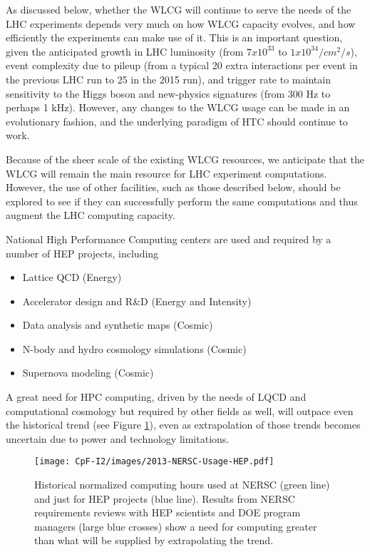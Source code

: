As discussed below, whether the WLCG will continue to serve the needs of the LHC experiments depends very much on how WLCG capacity evolves, and how efficiently the experiments can make use of it.  This is an important question, given the anticipated growth in LHC luminosity (from $7 x 10^33$ to $1 x 10^34 /cm^2/s$), event complexity due to pileup (from a typical 20 extra interactions per event in the previous LHC run to 25 in the 2015 run), and trigger rate to maintain sensitivity to the Higgs boson and new-physics signatures (from 300 Hz to perhaps 1 kHz).  However, any changes to the WLCG usage can be made in an evolutionary fashion, and the underlying paradigm of HTC should continue to work.

Because of the sheer scale of the existing WLCG resources, we anticipate that the WLCG will remain the main resource for LHC experiment computations.  However, the use of other facilities, such as those described below, should be explored to see if they can successfully perform the same computations and thus augment the LHC computing capacity.

National High Performance Computing centers are used and required by a number of HEP projects, including
\begin{itemize}
\item Lattice QCD (Energy)
\item Accelerator design and R\&D (Energy and Intensity)
\item Data analysis and synthetic maps (Cosmic)
\item N-body and hydro cosmology simulations (Cosmic)
\item Supernova modeling (Cosmic)
\end{itemize}

A great need for HPC computing, driven by the needs of LQCD and computational cosmology but required by other fields as well, will outpace even the historical trend (see Figure \ref{fig:NERSC-Computational-Hours}), even as extrapolation of those trends becomes uncertain due to power and technology limitations.

\begin{figure}[p]
\texttt{[image: CpF-I2/images/2013-NERSC-Usage-HEP.pdf]}
\caption{Historical normalized computing hours used at NERSC (green line) and just for HEP projects (blue line). Results from NERSC requirements reviews with HEP scientists and DOE program managers (large blue crosses) show a need for computing greater than what will be supplied by extrapolating the trend.}
\label{fig:NERSC-Computational-Hours}
\end{figure}

